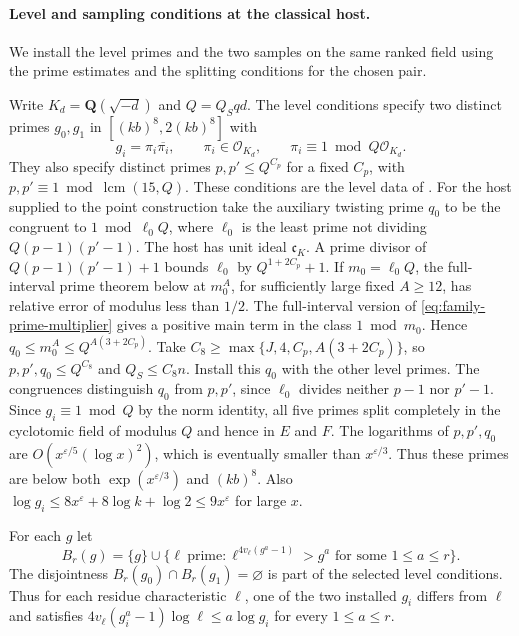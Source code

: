 \paragraph{Level and sampling conditions at the classical host.}
%
We install the level primes and the two samples on the
same ranked field using the prime estimates and the splitting
conditions for the chosen pair.

Write \(K_d=\mathbf Q(\sqrt{-d})\) and \(Q=Q_Sqd\). The level
conditions specify two distinct
primes \(g_0,g_1\) in \([(kb)^8,2(kb)^8]\) with
\[
 g_i=\pi_i\overline{\pi_i},\qquad
 \pi_i\in\mathcal O_{K_d},\qquad \pi_i\equiv1\bmod Q\mathcal O_{K_d}.
\]
They also specify distinct primes \(p,p'\le Q^{C_p}\) for a fixed
\(C_p\), with \(p,p'\equiv1\bmod\operatorname{lcm}(15,Q)\).
These conditions are the level data of
.
For the host supplied to the point construction take the auxiliary
twisting prime \(q_0\) to be the
congruent to \(1\bmod \ell_0Q\), where \(\ell_0\) is the least prime
not dividing \(Q(p-1)(p'-1)\). The host has unit ideal \(\mathfrak c_K\).
A prime divisor of \(Q(p-1)(p'-1)+1\) bounds
\(\ell_0\) by \(Q^{1+2C_p}+1\). If \(m_0=\ell_0Q\), the
full-interval prime theorem below at \(m_0^A\), for sufficiently
large fixed \(A\ge12\), has relative error of modulus less than \(1/2\).
The full-interval version of \eqref{eq:family-prime-multiplier}
gives a positive main term in the class \(1\bmod m_0\). Hence
\(q_0\le m_0^A\le Q^{A(3+2C_p)}\). Take
\(C_8\ge\max\{J,4,C_p,A(3+2C_p)\}\), so \(p,p',q_0\le Q^{C_8}\)
and \(Q_S\le C_8n\). Install this \(q_0\) with the other level primes.
The congruences distinguish \(q_0\) from \(p,p'\), since
\(\ell_0\) divides neither \(p-1\) nor \(p'-1\).
Since \(g_i\equiv1\bmod Q\) by the norm identity, all five primes
split completely in the cyclotomic field of modulus \(Q\) and hence
in \(E\) and \(F\). The logarithms of \(p,p',q_0\) are
\(O(x^{\varepsilon/5}(\log x)^2)\), which is eventually smaller
than \(x^{\varepsilon/3}\). Thus these primes are below both
\(\exp(x^{\varepsilon/3})\) and \((kb)^8\). Also
\(\log g_i\le8x^\varepsilon+8\log k+\log 2\le9x^\varepsilon\)
for large \(x\).

For each \(g\) let
\begin{equation}
\label{eq:classical-level-bad-primes}
 B_r(g)=\{g\}\cup
  \{\ell\ \text{prime}:\ell^{4v_\ell(g^a-1)}>g^a
                               \text{ for some }1\le a\le r\}.
\end{equation}
The disjointness \(B_r(g_0)\cap B_r(g_1)=\varnothing\) is part of
the selected level conditions. Thus for each residue characteristic
\(\ell\), one of the two installed \(g_i\) differs from \(\ell\)
and satisfies \(4v_\ell(g_i^a-1)\log\ell\le a\log g_i\) for
every \(1\le a\le r\).


